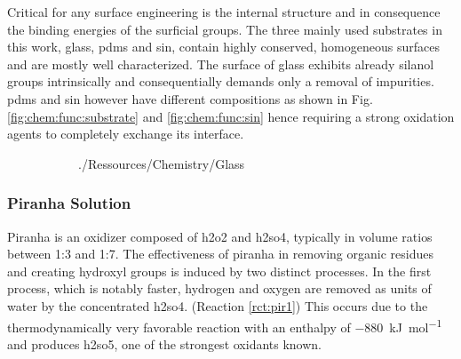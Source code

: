 Critical for any surface engineering is the internal structure and in consequence the binding energies of the surficial groups. The three mainly used substrates in this work, glass, \gls{pdms} and \gls{sin}, contain highly conserved, homogeneous surfaces and are mostly well characterized. The surface of glass exhibits already \gls{silanol} groups intrinsically and consequentially demands only a removal of impurities. \gls{pdms} and \gls{sin} however have different compositions as shown in Fig. \ref{fig:chem:func:substrate} and \ref{fig:chem:func:sin} hence requiring a strong oxidation agents to completely exchange its interface.  \cite{lit:chem:binding:sin, lit:chem:binding:pdms, lit:chem:surface:pdms}


\begin{figure}[h!]
	\begin{subfigure}[b]{0.30\textwidth}
		\centering
		\addtocounter{subfigure}{1}  
		 {./Ressources/Chemistry/Glass}		
		\addtocounter{subfigure}{-1}  
		\label{fig:chem:func:glass}
	\end{subfigure}%
	\hfill
	\begin{subfigure}[b]{0.69\textwidth}
		\centering
		\addtocounter{subfigure}{1}  
		\addtocounter{subfigure}{-1}  
		\label{fig:chem:func:pdms}
	\end{subfigure}
\end{figure}

\subsubsection{Piranha Solution}
Piranha is an oxidizer composed of \gls{h2o2} and \gls{h2so4}, typically in volume ratios between 1:3 and 1:7. The effectiveness of piranha in removing organic residues and creating \gls{hydroxyl} groups is induced by two distinct processes. In the first process, which is notably faster, hydrogen and oxygen are removed as units of water by the concentrated \gls{h2so4}.  (Reaction \ref{rct:pir1}) This occurs due to the thermodynamically very favorable reaction with an enthalpy of \SI{-880}{\kilo\joule\per\mole} and produces \gls{h2so5}, one of the strongest oxidants known.  \cite{lit:chem:piranha}

